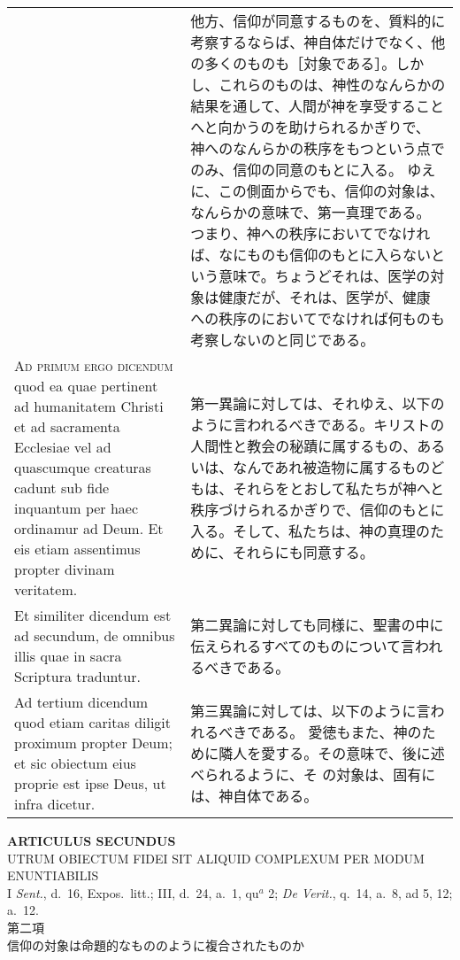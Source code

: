\documentclass[10pt]{jsarticle} %
\begin{document}
\begin{longtable}{p{21em}p{21em}}
&

他方、信仰が同意するものを、質料的に考察するならば、神自体だけでなく、他
 の多くのものも［対象である］。しかし、これらのものは、神性のなんらかの
 結果を通して、人間が神を享受することへと向かうのを助けられるかぎりで、
 神へのなんらかの秩序をもつという点でのみ、信仰の同意のもとに入る。
ゆえに、この側面からでも、信仰の対象は、なんらかの意味で、第一真理である。
 つまり、神への秩序においてでなければ、なにものも信仰のもとに入らないと
 いう意味で。ちょうどそれは、医学の対象は健康だが、それは、医学が、健康
 への秩序のにおいてでなければ何ものも考察しないのと同じである。


\\


{\scshape Ad primum ergo dicendum} quod ea quae
pertinent ad humanitatem Christi et ad sacramenta Ecclesiae vel ad
quascumque creaturas cadunt sub fide inquantum per haec ordinamur ad
Deum. Et eis etiam assentimus propter divinam veritatem.


&

第一異論に対しては、それゆえ、以下のように言われるべきである。キリストの
人間性と教会の秘蹟に属するもの、あるいは、なんであれ被造物に属するものど
もは、それらをとおして私たちが神へと秩序づけられるかぎりで、信仰のもとに
入る。そして、私たちは、神の真理のために、それらにも同意する。

\\


Et similiter dicendum est ad secundum,
de omnibus illis quae in sacra Scriptura traduntur.


&
第二異論に対しても同様に、聖書の中に伝えられるすべてのものについて言われ
 るべきである。



\\


Ad tertium dicendum quod etiam caritas
diligit proximum propter Deum; et sic obiectum eius proprie est ipse
Deus, ut infra dicetur.


&

第三異論に対しては、以下のように言われるべきである。
愛徳もまた、神のために隣人を愛する。その意味で、後に述べられるように、そ
 の対象は、固有には、神自体である。


\end{longtable}

\newpage

\begin{center}
 {\Large {\bf ARTICULUS SECUNDUS}}\\
 {\large UTRUM OBIECTUM FIDEI SIT ALIQUID COMPLEXUM PER MODUM ENUNTIABILIS}\\
 {\footnotesize I {\itshape Sent.}, d.~16, Expos.~litt.; III, d.~24,
 a.~1, qu$^a$ 2; {\itshape De Verit.}, q.~14, a.~8, ad 5, 12; a.~12.}\\
 {\Large 第二項\\信仰の対象は命題的なもののように複合されたものか}
\end{center}
\end{document}
